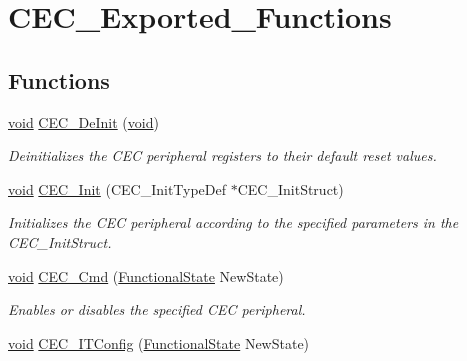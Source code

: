 \hypertarget{group___c_e_c___exported___functions}{\section{C\-E\-C\-\_\-\-Exported\-\_\-\-Functions}
\label{group___c_e_c___exported___functions}
}
\subsection*{Functions}
\begin{DoxyCompactItemize}
\item 
\hyperlink{group___n_a_m_e_ga18028b8badbf1ea7e704ccac3c488e82}{void} \hyperlink{group___c_e_c___exported___functions_ga604c3b15b51a46303c201fa3deac2212}{C\-E\-C\-\_\-\-De\-Init} (\hyperlink{group___n_a_m_e_ga18028b8badbf1ea7e704ccac3c488e82}{void})
\begin{DoxyCompactList}\small\item\em Deinitializes the C\-E\-C peripheral registers to their default reset values. \end{DoxyCompactList}\item 
\hyperlink{group___n_a_m_e_ga18028b8badbf1ea7e704ccac3c488e82}{void} \hyperlink{group___c_e_c___exported___functions_gaf48aee745a16370372b3eaa7cf3ed22b}{C\-E\-C\-\_\-\-Init} (C\-E\-C\-\_\-\-Init\-Type\-Def $\ast$C\-E\-C\-\_\-\-Init\-Struct)
\begin{DoxyCompactList}\small\item\em Initializes the C\-E\-C peripheral according to the specified parameters in the C\-E\-C\-\_\-\-Init\-Struct. \end{DoxyCompactList}\item 
\hyperlink{group___n_a_m_e_ga18028b8badbf1ea7e704ccac3c488e82}{void} \hyperlink{group___c_e_c___exported___functions_ga0c8efa79e5768930e567b3b3ed6e09e9}{C\-E\-C\-\_\-\-Cmd} (\hyperlink{group___exported__types_gac9a7e9a35d2513ec15c3b537aaa4fba1}{Functional\-State} New\-State)
\begin{DoxyCompactList}\small\item\em Enables or disables the specified C\-E\-C peripheral. \end{DoxyCompactList}\item 
\hyperlink{group___n_a_m_e_ga18028b8badbf1ea7e704ccac3c488e82}{void} \hyperlink{group___c_e_c___exported___functions_ga8be87c514505cf82eb29334f054fc0bc}{C\-E\-C\-\_\-\-I\-T\-Config} (\hyperlink{group___exported__types_gac9a7e9a35d2513ec15c3b537aaa4fba1}{Functional\-State} New\-State)

\end{DoxyCompactItemize}
